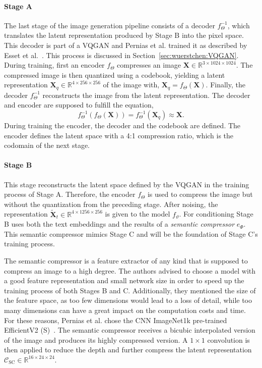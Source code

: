 \paragraph*{Stage A} The last stage of the image generation pipeline consists of a decoder
$f_{\Theta}^{-1}$, which translates the latent representation produced by Stage B into
the pixel space. This decoder is part of a VQGAN and Pernias et al. trained it as
described by Esset et al.~\cite{esser2021tamingtransformershighresolutionimage}.
This process is discussed in Section~\ref{sec:wuerstchen:VQGAN}. During training,
first an encoder $f_{\Theta}$ compresses an image $\boldsymbol{X}\in\mathbb{R}^{3\times1024\times1024}$. The compressed image is
then quantized using a codebook, yielding a latent representation $\boldsymbol{X}_q\in\mathbb{R}^{4\times256\times256}$ of the image with,
$\boldsymbol{X}_q = f_{\Theta}(\boldsymbol{X}).$
Finally, the decoder $f_{\Theta}^{-1}$ reconstructs the image from the latent representation.
The decoder and encoder are supposed to fulfill the equation,
\begin{equation*}
    f_{\Theta}^{-1}(f_{\Theta}(\boldsymbol{X})) = f_{\Theta}^{-1}(\boldsymbol{X}_q) \approx \boldsymbol{X}.
\end{equation*}
During training the encoder, the decoder and the codebook are defined. The
encoder defines the latent space with a 4:1 compression ratio, which is
the codomain of the next stage.

\paragraph*{Stage B} This stage reconstructs the latent space defined by the
VQGAN in the training process of Stage A. Therefore, the encoder $f_{\Theta}$
is used to compress the image but without the quantization from the preceding stage.
After noising, the representation $\tilde{\boldsymbol{X}}_t\in\mathbb{R}^{4\times1256\times256}$
is given to the model $f_\vartheta$. For
conditioning Stage B uses both the text embeddings and the results of a
\emph{semantic compressor} $e_{\Phi}$. This semantic compressor mimics Stage C and will be
the foundation of Stage C's training process.

The semantic compressor is a feature extractor of any kind that is supposed to
compress an image to a high degree. The authors advised to choose a model with a
good feature representation and small network size in order to speed up the training
process of both Stages B and C. Additionally, they mentioned the size of the
feature space, as too few dimensions would lead to a loss of detail, while too
many dimensions can have a great impact on the computation costs and time. For
these reasons, Pernias et al. chose the CNN ImageNet1k pre-trained EfficientV2 (S)~\cite{Tan2021EfficientNetV2}.
The semantic compressor receives a bicubic interpolated version of the image and
produces its highly compressed version. A $1\times1$ convolution is then
applied to reduce the depth and further compress the latent representation $\mathcal{C}_{\text{SC}}\in\mathbb{R}^{16\times24\times24}$.

